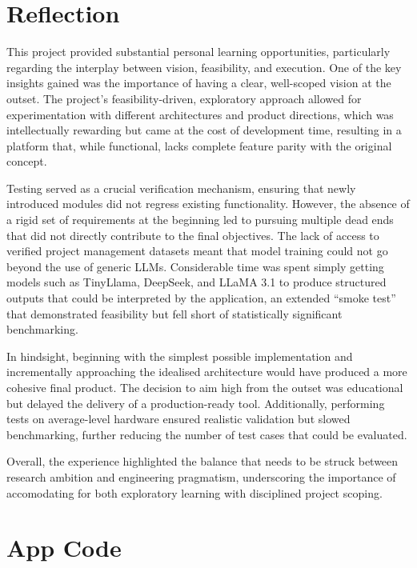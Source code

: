 \documentclass{report}
\begin{document}
\section{Reflection}
This project provided substantial personal learning opportunities, particularly regarding the interplay between vision, feasibility, and execution. 
One of the key insights gained was the importance of having a clear, well-scoped vision at the outset. 
The project’s feasibility-driven, exploratory approach allowed for experimentation with different architectures and product directions, which was intellectually rewarding but came at the cost of development time, resulting in a platform that, while functional, lacks complete feature parity with the original concept.

Testing served as a crucial verification mechanism, ensuring that newly introduced modules did not regress existing functionality. 
However, the absence of a rigid set of requirements at the beginning led to pursuing multiple dead ends that did not directly contribute to the final objectives. 
The lack of access to verified project management datasets meant that model training could not go beyond the use of generic LLMs.
Considerable time was spent simply getting models such as TinyLlama, DeepSeek, and LLaMA 3.1 to produce structured outputs that could be interpreted by the application, an extended “smoke test” that demonstrated feasibility but fell short of statistically significant benchmarking.

In hindsight, beginning with the simplest possible implementation and incrementally approaching the idealised architecture would have produced a more cohesive final product. 
The decision to aim high from the outset was educational but delayed the delivery of a production-ready tool. 
Additionally, performing tests on average-level hardware ensured realistic validation but slowed benchmarking, further reducing the number of test cases that could be evaluated.

Overall, the experience highlighted the balance that needs to be struck between research ambition and engineering pragmatism, underscoring the importance of accomodating for both  exploratory learning with disciplined project scoping.



\printbibliography 

\appendix

\section{App Code}
\end{document}
